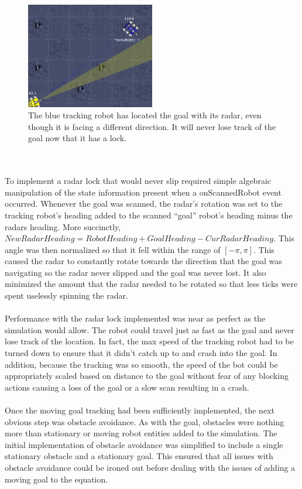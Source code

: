 \documentclass{aiaa-tc}%
\begin{document}
\begin{figure}[htb]
\centering
\includegraphics[width=0.5\textwidth]{images/RadarLock}
\caption{The blue tracking robot has located the goal with its radar, even though it is facing a different direction. It will never lose track of the goal now that it has a lock.}
\label{Radar Lock Example}
\end{figure} \\ \\
\noindent
To implement a radar lock that would never slip required simple algebraic manipulation of the state information present when a onScannedRobot event occurred. Whenever the goal was scanned, the radar's rotation was set to the tracking robot's heading added to the scanned ``goal'' robot's heading minus the radars heading. More succinctly, $NewRadarHeading = RobotHeading + GoalHeading - CurRadarHeading$. This angle was then normalized so that it fell within the range of $[-\pi, \pi]$. This caused the radar to constantly rotate towards the direction that the goal was navigating so the radar never slipped and the goal was never lost. It also minimized the amount that the radar needed to be rotated so that less ticks were spent uselessly spinning the radar. \\ \\
Performance with the radar lock implemented was near as perfect as the simulation would allow. The robot could travel just as fast as the goal and never lose track of the location. In fact, the max speed of the tracking robot had to be turned down to ensure that it didn't catch up to and crash into the goal. In addition, because the tracking was so smooth, the speed of the bot could be appropriately scaled based on distance to the goal without fear of any blocking actions causing a loss of the goal or a slow scan resulting in a crash. \\ \\
Once the moving goal tracking had been sufficiently implemented, the next obvious step was obstacle avoidance. As with the goal, obstacles were nothing more than stationary or moving robot entities added to the simulation. The initial implementation of obstacle avoidance was simplified to include a single stationary obstacle and a stationary goal. This ensured that all issues with obstacle avoidance could be ironed out before dealing with the issues of adding a moving goal to the equation.  \\ \\
\end{document}
